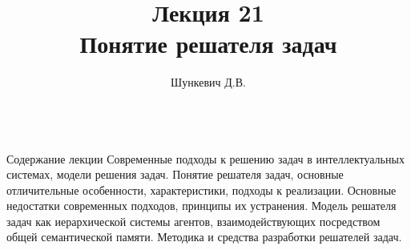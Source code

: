 \title{Лекция 21\\Понятие решателя задач}
\author[]{Шункевич Д.В.}

\begin{frame}
	\titlepage
\end{frame}

\begin{frame}{\\Содержание лекции}
	\topline
	\justifying
	Современные подходы к решению задач в интеллектуальных системах, модели решения задач. Понятие решателя задач, основные отличительные особенности, характеристики, подходы к реализации. Основные недостатки современных подходов, принципы их устранения. Модель решателя задач как иерархической системы агентов, взаимодействующих посредством общей семантической памяти. Методика и средства разработки решателей задач.
\end{frame}